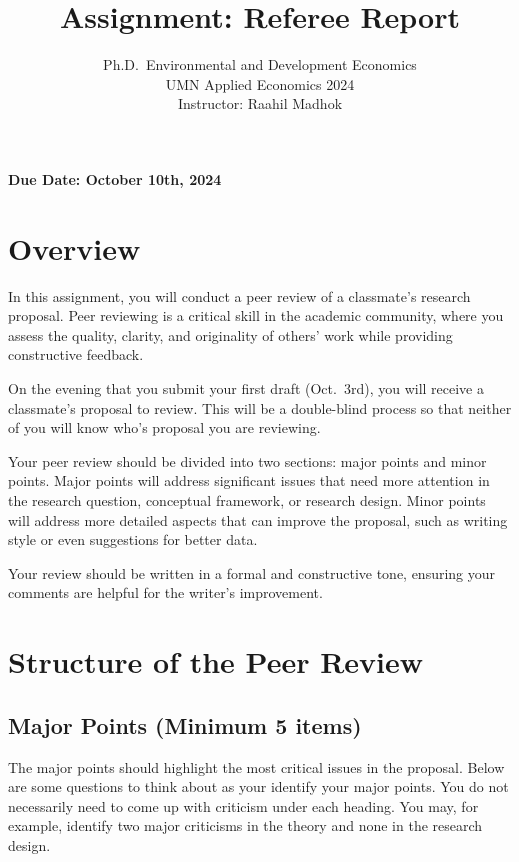\documentclass[
]{article}
\title{Assignment: Referee Report}
\subtitle{Ph.D.~Environmental and Development Economics\\
UMN Applied Economics 2024\\
Instructor: Raahil Madhok}
\author{}
\date{\vspace{-2.5em}}
\begin{document}
\maketitle

\textbf{Due Date: October 10th, 2024}

\hypertarget{overview}{%
\section{Overview}\label{overview}}

In this assignment, you will conduct a peer review of a classmate's research proposal. Peer reviewing is a critical skill in the academic community, where you assess the quality, clarity, and originality of others' work while providing constructive feedback.

On the evening that you submit your first draft (Oct.~3rd), you will receive a classmate's proposal to review. This will be a double-blind process so that neither of you will know who's proposal you are reviewing.

Your peer review should be divided into two sections: major points and minor points. Major points will address significant issues that need more attention in the research question, conceptual framework, or research design. Minor points will address more detailed aspects that can improve the proposal, such as writing style or even suggestions for better data.

Your review should be written in a formal and constructive tone, ensuring your comments are helpful for the writer's improvement.

\hypertarget{structure-of-the-peer-review}{%
\section{Structure of the Peer Review}\label{structure-of-the-peer-review}}

\hypertarget{major-points-minimum-5-items}{%
\subsection{Major Points (Minimum 5 items)}\label{major-points-minimum-5-items}}

The major points should highlight the most critical issues in the proposal. Below are some questions to think about as your identify your major points. You do not necessarily need to come up with criticism under each heading. You may, for example, identify two major criticisms in the theory and none in the research design.
\end{document}
